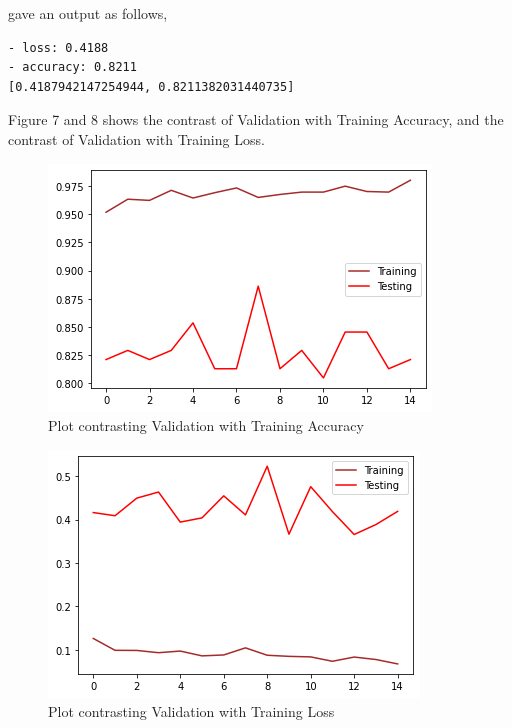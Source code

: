 \documentclass[conference]{IEEEtran}
\begin{document}
gave an output as follows, 
\begin{verbatim}
- loss: 0.4188 
- accuracy: 0.8211
[0.4187942147254944, 0.8211382031440735]
\end{verbatim}
Figure 7 and 8 shows the contrast of Validation with Training Accuracy, and the contrast of Validation with Training Loss.
\begin{figure}[htbp]
\label{fig7}
\centerline{\includegraphics[width = \linewidth]{7}}
\caption{Plot contrasting Validation with Training Accuracy}
\end{figure}
\begin{figure}[htbp]
\label{fig8}
\centerline{\includegraphics[width = \linewidth]{8}}
\caption{Plot contrasting Validation with Training Loss}
\end{figure}
\textbf{\\}
\end{document}
